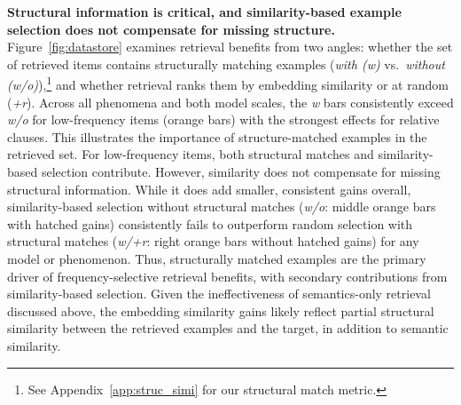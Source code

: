 \noindent \textbf{Structural information is critical, and similarity-based example selection does not compensate for missing structure.} Figure~\ref{fig:datastore} examines retrieval benefits from two angles: whether the set of retrieved items contains structurally matching examples (\emph{with (w)} vs.\ \emph{without (w/o)}),\footnote{See Appendix~\ref{app:struc_simi} for our structural match metric.} and whether retrieval ranks them by embedding similarity or at random (\emph{+r}). Across all phenomena and both model scales, the \emph{w} bars consistently exceed \emph{w/o} for low-frequency items (orange bars) with the strongest effects for relative clauses. This illustrates the importance of structure-matched examples in the retrieved set. For low-frequency items, both structural matches and similarity-based selection contribute. However, similarity does not compensate for missing structural information. While it does add smaller, consistent gains overall, similarity-based selection without structural matches (\textit{w/o}: middle orange bars with hatched gains) consistently fails to outperform random selection with structural matches (\textit{w/+r}: right orange bars without hatched gains) for any model or phenomenon. Thus, structurally matched examples are the primary driver of frequency-selective retrieval benefits, with secondary contributions from similarity-based selection. Given the ineffectiveness of semantics-only retrieval discussed above, the embedding similarity gains likely reflect partial structural similarity between the retrieved examples and the target, in addition to semantic similarity.




